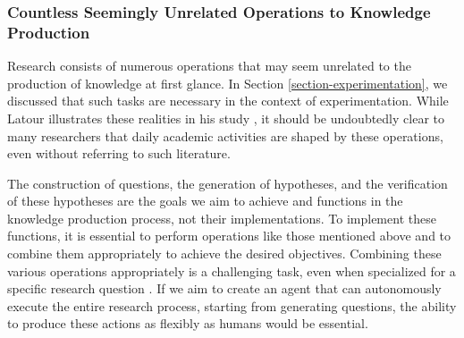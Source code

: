 

\subsubsection{Countless Seemingly Unrelated Operations to Knowledge Production}
\label{section-countless-seemingly-unrelated-operations-to-knowledge-production}

Research consists of numerous operations that may seem unrelated to the production of knowledge at first glance. In Section \ref{section-experimentation}, we discussed that such tasks are necessary in the context of experimentation. While Latour illustrates these realities in his study \cite{latour1987science}, it should be undoubtedly clear to many researchers that daily academic activities are shaped by these operations, even without referring to such literature.

The construction of questions, the generation of hypotheses, and the verification of these hypotheses are the goals we aim to achieve and functions in the knowledge production process, not their implementations. To implement these functions, it is essential to perform operations like those mentioned above and to combine them appropriately to achieve the desired objectives. Combining these various operations appropriately is a challenging task, even when specialized for a specific research question \cite{coley2020autonomousII}. If we aim to create an agent that can autonomously execute the entire research process, starting from generating questions, the ability to produce these actions as flexibly as humans would be essential.

